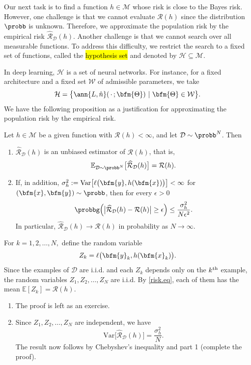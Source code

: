 Our next task is to find a function $h\in \mathcal{M}$ whose risk is close to the Bayes risk. However, one challenge is that we cannot evaluate $\mathcal{R}(h)$ since the distribution $\probb$ is unknown. Therefore, we approximate the population risk by the empirical risk $\widehat{\mathcal{R}}_{\mathcal{D}}(h)$.  Another challenge is that we cannot search over all measurable functions.  To address this difficulty, we restrict the search to a fixed set of functions{\color{red},} called the \hl{hypothesis set} and denoted by $\mathcal{H} \subseteq \mathcal{M}$.

In deep learning, $\mathcal{H}$ is a set of neural networks.  For instance, for a fixed architecture and a fixed set $\mathcal{W}$ of admissible parameters, we take
$$
\mathcal{H} = \big\{\ann{L,\hat{n}}(\,\cdot\,;\bfm{\Theta})~|~\bfm{\Theta}\in\mathcal{W}\big\}.
$$
We have the following proposition as a justification for approximating the population risk by the empirical risk.
\begin{lemma}\label{empirical.risk.unbiased.prop}

Let $h \in \mathcal{M}$ be a given function with $\mathcal{R}(h)<\infty$, and let $\mathcal{D}\sim\probb^N$.  Then
\begin{enumerate}
\item $\widehat{\mathcal{R}}_{\mathcal{D}}(h)$ is an unbiased estimator of $\mathcal{R}(h)$, that is,
$$
\mathbb{E}_{\mathcal{D}\sim\probb^N}\big[\widehat{\mathcal{R}}_{\mathcal{D}}(h)\big] = \mathcal{R}(h).
$$
\item If, in addition, $\sigma_h^2 := \mathrm{Var}\big[\ell\big(\bfm{y},h(\bfm{x})\big)\big]<\infty$ for $(\bfm{x},\bfm{y})\sim\probb$, then for every $\epsilon>0$
$$
\probbg\Big(\big|\widehat{\mathcal{R}}_{\mathcal{D}}(h)-\mathcal{R}(h)\big|\ge\epsilon\Big) \le \frac{\sigma_h^2}{N\epsilon^2}.
$$
In particular, $\widehat{\mathcal{R}}_{\mathcal{D}}(h)\rightarrow\mathcal{R}(h)$ in probability as $N\rightarrow\infty$.
\end{enumerate}
\end{lemma}
\begin{proofs}

For $k=1,2,\ldots,N,$ define the random variable
$$
Z_k = \ell\big(\bfm{y}_k,h(\bfm{x}_k)\big).
$$
Since the examples of $\mathcal{D}$ are i.i.d. and each $Z_k$ depends only on the $k^{\rm th}$ example, the random variables $Z_1,Z_2,\ldots,Z_N$ are i.i.d.  By \eqref{risk.eq}, each of them has the mean $\mathbb{E}[Z_k]=\mathcal{R}(h)$.

\begin{enumerate}
\item The proof is left as an exercise.\\

\item Since $Z_1,Z_2,\ldots,Z_N$ are independent, we have
$$
\mathrm{Var}\big[\widehat{\mathcal{R}}_{\mathcal{D}}(h)\big]  = \frac{\sigma_h^2}{N}.
$$
The result now follows by Chebyshev's inequality and part 1 (complete the proof).
\end{enumerate}
\end{proofs}

